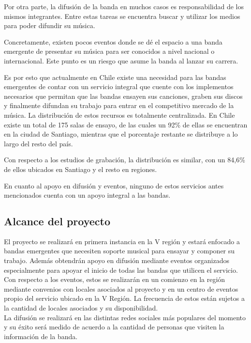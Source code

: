 Por otra parte, la difusión de la banda en muchos casos es responsabilidad
de los mismos integrantes. Entre estas tareas se encuentra buscar y utilizar
los medios para poder difundir su música.

Concretamente, existen pocos eventos donde se dé el espacio a una banda 
emergente de presentar su música para ser conocidos a nivel nacional
o internacional. Este punto es un riesgo que asume la banda al lanzar
su carrera.

Es por esto que actualmente en Chile existe una necesidad para las bandas 
emergentes de contar con un servicio integral que cuente con los implementos
necesarios que permitan que las bandas ensayen sus canciones, graben sus discos
y finalmente difundan su trabajo para entrar en el competitivo mercado
de la música. La distribución de estos recursos es totalmente centralizada. En 
Chile existe un total de 175 salas de ensayo, de las cuales un 92\% de ellas 
se encuentran en la ciudad de Santiago, mientras que el porcentaje
restante se distribuye a lo largo del resto del país.

Con respecto a los estudios de grabación, la distribución es similar, con un
84,6\% de ellos ubicados en Santiago y el resto en regiones. 

En cuanto al apoyo en difusión y eventos, ninguno de estos servicios antes 
mencionados cuenta con un apoyo integral a las bandas.

\subsection{Alcance del proyecto}

El proyecto se realizará en primera instancia 
en la V región y estará enfocado a bandas emergentes 
que necesiten soporte musical para ensayar y 
componer su trabajo. Además obtendrán apoyo 
en difusión mediante eventos organizados 
especialmente para apoyar el inicio de todas 
las bandas que utilicen el servicio.\\

Con respecto a los eventos, estos se realizarán en 
un comienzo en la región mediante convenios 
con locales asociados al proyecto y en un centro de eventos
propio  del servicio ubicado en la V Región. La frecuencia 
de estos están sujetos a la cantidad de locales 
asociados y su disponibilidad.\\

La difusión se realizará en 
las distintas redes sociales más populares del 
momento y su éxito será medido de acuerdo a 
la cantidad de personas que visiten la información 
de la banda.\\

